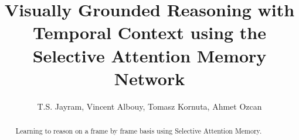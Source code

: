 \documentclass{article}
\title{Visually Grounded Reasoning with Temporal Context using the Selective Attention Memory Network}
\author{T.S. Jayram, Vincent Albouy, Tomasz Kornuta, Ahmet Ozcan}
\theoremstyle{remark}
\theoremstyle{definition}
\begin{document}
\maketitle
\begin{abstract}
	Learning to reason on a frame by frame basis using Selective Attention Memory. 
\end{abstract}
	

	












\newpage



\newpage

\end{document}
